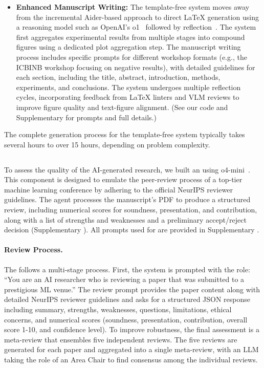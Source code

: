 \begin{itemize}
    \item \textbf{Enhanced Manuscript Writing:} The template-free system moves away from the incremental Aider-based approach to direct LaTeX generation using a reasoning model such as OpenAI's o1~\citep{OpenAIOS} followed by reflection~\citep{shinn2023reflexion}. The system first aggregates experimental results from multiple stages into compound figures using a dedicated plot aggregation step. The manuscript writing process includes specific prompts for different workshop formats (e.g., the ICBINB workshop focusing on negative results), with detailed guidelines for each section, including the title, abstract, introduction, methods, experiments, and conclusions. The system undergoes multiple reflection cycles, incorporating feedback from LaTeX linters and VLM reviews to improve figure quality and text-figure alignment. (See our code and Supplementary  for prompts and full details.)
\end{itemize}

The complete generation process for the template-free system typically takes several hours to over 15 hours, depending on problem complexity.


\subsection*{\ourreviewer}
To assess the quality of the AI-generated research, we built an \ourreviewer using o4-mini~\citep{openai2025o3o4mini}. This component is designed to emulate the peer-review process of a top-tier machine learning conference by adhering to the official NeurIPS reviewer guidelines. The agent processes the manuscript's PDF to produce a structured review, including numerical scores for soundness, presentation, and contribution, along with a list of strengths and weaknesses and a preliminary accept/reject decision (Supplementary ). All prompts used for \ourreviewer are provided in Supplementary .

\paragraph{Review Process.}
The \ourreviewer follows a multi-stage process. First, the system is prompted with the role: ``You are an AI researcher who is reviewing a paper that was submitted to a prestigious ML venue.'' The review prompt provides the paper content along with detailed NeurIPS reviewer guidelines and asks for a structured JSON response including summary, strengths, weaknesses, questions, limitations, ethical concerns, and numerical scores (soundness, presentation, contribution, overall score 1-10, and confidence level). To improve robustness, the final assessment is a meta-review that ensembles five independent reviews. The five reviews are generated for each paper and aggregated into a single meta-review, with an LLM taking the role of an Area Chair to find consensus among the individual reviews.

